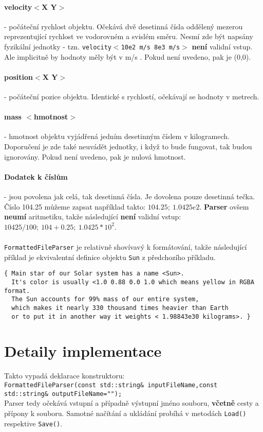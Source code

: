 \paragraph{velocity$ < $X Y$ > $} - počáteční rychlost objektu. Očekává dvě desetinná čísla oddělený mezerou reprezentující rychlost ve vodorovném a svislém směru. Nesmí zde být napsány fyzikální jednotky - tzn. \texttt{velocity$ < $10e2 m/s 8e3 m/s$ > $} \textbf{není} validní vstup. Ale implicitně by hodnoty měly být v m/s . Pokud není uvedeno, pak je (0,0).
\paragraph{position$ < $X Y$ > $} - počáteční pozice objektu. Identické s rychlostí, očekávají se hodnoty v metrech.
\paragraph{mass $ < $hmotnost$ > $ } - hmotnost objektu vyjádřená jedním desetinným číslem v kilogramech. Doporučení je zde také neuvádět jednotky, i když to bude fungovat, tak budou ignorovány. Pokud není uvedeno, pak je nulová hmotnost.
\paragraph{Dodatek k číslům} - jsou povolena jak celá, tak desetinná čísla. Je dovolena pouze desetinná tečka. Číslo 104.25 můžeme zapsat například takto: $ 104.25 ;\ 1.0425e2$.
\textbf{Parser} ovšem \textbf{neumí} aritmetiku, takže následující \textbf{není} validní vstup: $ 10425/100 ;\ 104 + 0.25 ;\ 1.0425 * 10^2 $.
\paragraph{}
\texttt{FormattedFileParser} je relativně shovívavý k formátování, takže následující příklad je ekvivalentní definice objektu \texttt{Sun} z předchozího příkladu.
\begin{lstlisting}
{ Main star of our Solar system has a name <Sun>. 
  It's color is usually <1.0 0.88 0.0 1.0 which means yellow in RGBA format.
  The Sun accounts for 99% mass of our entire system,
  which makes it nearly 330 thousand times heavier than Earth
  or to put it in another way it weights < 1.98843e30 kilograms>. }
\end{lstlisting}

\section{Detaily implementace}
Takto vypadá deklarace konstruktoru: \\
\lstinline|FormattedFileParser(const std::string& inputFileName,const std::string& outputFileName="");|\\
Parser tedy očekává vstupní a případně výstupní jméno souboru,\textbf{ včetně} cesty a přípony k souboru. Samotné načítání a ukládání probíhá v metodách \texttt{Load()} respektive \texttt{Save()}.

